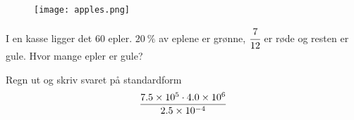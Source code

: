 %


\Oppgave[2] 

\begin{figure}[H]
  \centering
  \texttt{[image: apples.png]}
\end{figure}

I en kasse ligger det $60$ epler. $\SI{20}{\percent}$ av eplene er grønne,
$\cfrac{7}{12}$ er røde og resten er gule. Hvor mange epler er gule?


\Oppgave[2] 

Regn ut og skriv svaret på standardform
%
\begin{equation*}
  \frac{\num{7.5E5} \cdot \num{4.0E6}}{\num{2.5E-4}}
\end{equation*}


\Oppgave[2] 

